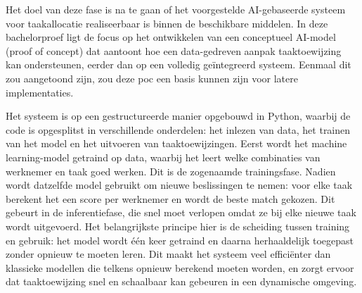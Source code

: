 




\vspace{1em}Het doel van deze fase is na te gaan of het voorgestelde AI-gebaseerde systeem voor taakallocatie realiseerbaar is binnen de beschikbare middelen. In deze bachelorproef ligt de focus op het ontwikkelen van een conceptueel AI-model (proof of concept) dat aantoont hoe een data-gedreven aanpak taaktoewijzing kan ondersteunen, eerder dan op een volledig geïntegreerd systeem. Eenmaal dit zou aangetoond zijn, zou deze poc een basis kunnen zijn voor latere implementaties. %

Het systeem is op een gestructureerde manier opgebouwd in Python, waarbij de code is opgesplitst in verschillende onderdelen: het inlezen van data, het trainen van het model en het uitvoeren van taaktoewijzingen. Eerst wordt het machine learning-model getraind op data, waarbij het leert welke combinaties van werknemer en taak goed werken. Dit is de zogenaamde trainingsfase. Nadien wordt datzelfde model gebruikt om nieuwe beslissingen te nemen: voor elke taak berekent het een score per werknemer en wordt de beste match gekozen. Dit gebeurt in de inferentiefase, die snel moet verlopen omdat ze bij elke nieuwe taak wordt uitgevoerd. Het belangrijkste principe hier is de scheiding tussen training en gebruik: het model wordt één keer getraind en daarna herhaaldelijk toegepast zonder opnieuw te moeten leren. Dit maakt het systeem veel efficiënter dan klassieke modellen die telkens opnieuw berekend moeten worden, en zorgt ervoor dat taaktoewijzing snel en schaalbaar kan gebeuren in een dynamische omgeving.

